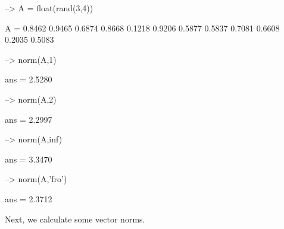 \begin{DoxyVerbInclude}
--> A = float(rand(3,4))

A = 
    0.8462    0.9465    0.6874    0.8668 
    0.1218    0.9206    0.5877    0.5837 
    0.7081    0.6608    0.2035    0.5083 

--> norm(A,1)

ans = 
    2.5280 

--> norm(A,2)

ans = 
    2.2997 

--> norm(A,inf)

ans = 
    3.3470 

--> norm(A,'fro')

ans = 
    2.3712 
\end{DoxyVerbInclude}


Next, we calculate some vector norms.


